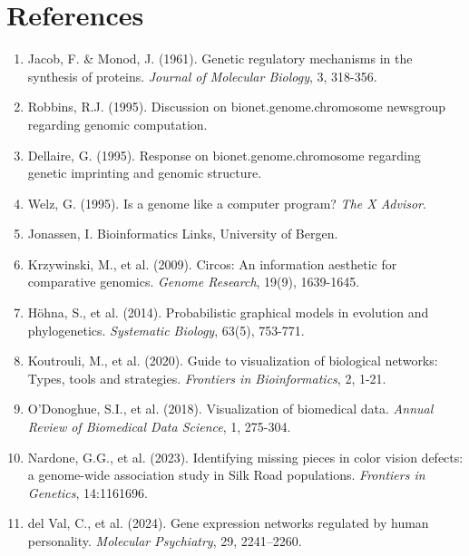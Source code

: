 \documentclass[11pt]{article}
\begin{document}
\section*{References}

\begin{enumerate}
\item Jacob, F. \& Monod, J. (1961). Genetic regulatory mechanisms in the synthesis of proteins. \textit{Journal of Molecular Biology}, 3, 318-356.
\item Robbins, R.J. (1995). Discussion on bionet.genome.chromosome newsgroup regarding genomic computation.
\item Dellaire, G. (1995). Response on bionet.genome.chromosome regarding genetic imprinting and genomic structure.
\item Welz, G. (1995). Is a genome like a computer program? \textit{The X Advisor}.
\item Jonassen, I. Bioinformatics Links, University of Bergen.
\item Krzywinski, M., et al. (2009). Circos: An information aesthetic for comparative genomics. \textit{Genome Research}, 19(9), 1639-1645.
\item Höhna, S., et al. (2014). Probabilistic graphical models in evolution and phylogenetics. \textit{Systematic Biology}, 63(5), 753-771.
\item Koutrouli, M., et al. (2020). Guide to visualization of biological networks: Types, tools and strategies. \textit{Frontiers in Bioinformatics}, 2, 1-21.
\item O'Donoghue, S.I., et al. (2018). Visualization of biomedical data. \textit{Annual Review of Biomedical Data Science}, 1, 275-304.
\item Nardone, G.G., et al. (2023). Identifying missing pieces in color vision defects: a genome-wide association study in Silk Road populations. \textit{Frontiers in Genetics}, 14:1161696.
\item del Val, C., et al. (2024). Gene expression networks regulated by human personality. \textit{Molecular Psychiatry}, 29, 2241–2260.
\end{enumerate}
\end{document}
